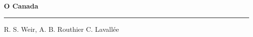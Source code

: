 \documentclass[10pt]{book}
\begin{document}
{
  \samepage
  \raggedbottom
  \raggedright
  \sloppy


  \vspace{0.2in}

  \noindent\begin{minipage}{.1\textwidth}
    \hfill\vspace{0.1in}
  \end{minipage}%
  \noindent\begin{minipage}{.8\textwidth}
    \centering
    \bfseries
    \large O Canada
  \end{minipage}%
  \noindent\begin{minipage}{.1\textwidth}
      \hfill\vspace{0.1in}
  \end{minipage}

  \nopagebreak[4]
  \vspace{0.1in}
  \nopagebreak[4]
  \hrule height 0.05ex
  \nopagebreak[4]
  \vspace{-0.05in}

  {\footnotesize R. S. Weir, A. B. Routhier \hfill C. Lavall\'{e}e }\\
  \vspace{0.01in}



}
\end{document}
